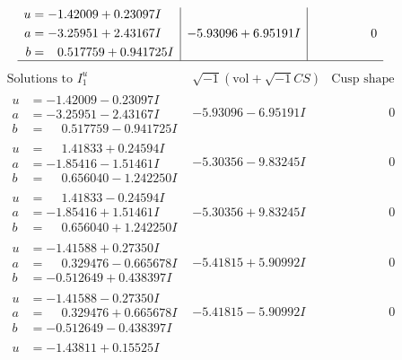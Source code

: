 \documentclass[1p]{elsarticle_modified}
\theoremstyle{definition}
\newcommand{\I}{\sqrt{-1}}
\begin{document}
$$\begin{array}{c|c|c}
\begin{aligned}
u &= -1.42009 + 0.23097 I \\
a &= -3.25951 + 2.43167 I \\
b &= \phantom{-}0.517759 + 0.941725 I\end{aligned}
 & -5.93096 + 6.95191 I & \phantom{-0.000000 } 0\\
 \hline 
 \end{array}$$\newpage$$\begin{array}{c|c|c}  
\text{Solutions to }I^u_{1}& \I (\text{vol} + \sqrt{-1}CS) & \text{Cusp shape}\\
 \hline 
\begin{aligned}
u &= -1.42009 - 0.23097 I \\
a &= -3.25951 - 2.43167 I \\
b &= \phantom{-}0.517759 - 0.941725 I\end{aligned}
 & -5.93096 - 6.95191 I & \phantom{-0.000000 } 0 \\ \hline\begin{aligned}
u &= \phantom{-}1.41833 + 0.24594 I \\
a &= -1.85416 - 1.51461 I \\
b &= \phantom{-}0.656040 - 1.242250 I\end{aligned}
 & -5.30356 - 9.83245 I & \phantom{-0.000000 } 0 \\ \hline\begin{aligned}
u &= \phantom{-}1.41833 - 0.24594 I \\
a &= -1.85416 + 1.51461 I \\
b &= \phantom{-}0.656040 + 1.242250 I\end{aligned}
 & -5.30356 + 9.83245 I & \phantom{-0.000000 } 0 \\ \hline\begin{aligned}
u &= -1.41588 + 0.27350 I \\
a &= \phantom{-}0.329476 - 0.665678 I \\
b &= -0.512649 + 0.438397 I\end{aligned}
 & -5.41815 + 5.90992 I & \phantom{-0.000000 } 0 \\ \hline\begin{aligned}
u &= -1.41588 - 0.27350 I \\
a &= \phantom{-}0.329476 + 0.665678 I \\
b &= -0.512649 - 0.438397 I\end{aligned}
 & -5.41815 - 5.90992 I & \phantom{-0.000000 } 0 \\ \hline\begin{aligned}
u &= -1.43811 + 0.15525 I \\

\end{aligned}
\end{array}$$
\end{document}
